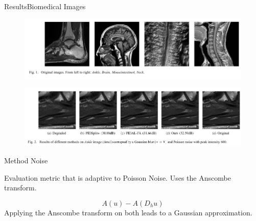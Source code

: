 \documentclass{beamer}
\begin{document}
\begin{frame}{Results}{Biomedical Images}
\begin{figure}
    \centering
    \includegraphics[scale=0.55]{result_originalimages.png}
\end{figure}

\begin{figure}
    \centering
    \includegraphics[scale=0.55]{result_ankle.png}
\end{figure}

\end{frame}

\begin{frame}{Method Noise}

Evaluation metric that is adaptive to Poisson Noise. Uses the Anscombe transform. 

\[
A(u) - A(D_h u)
\]
Applying the Anscombe transform on both leads to a Gaussian approximation.
\end{frame}
\end{document}
